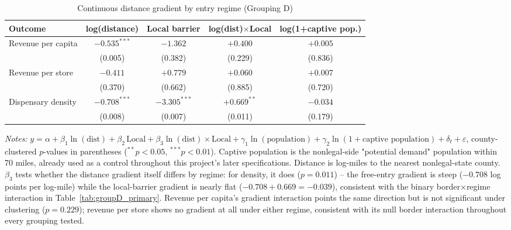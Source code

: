 \begin{table}[htbp]
\centering
\caption{Continuous distance gradient by entry regime (Grouping D)}
\label{tab:continuous_distance}
\footnotesize
\begin{tabular}{lcccc}
\toprule
Outcome & log(distance) & Local barrier & log(dist)$\times$Local & log(1+captive pop.) \\
\midrule
Revenue per capita & $-0.535^{***}$ & $-1.362$ & $+0.400$ & $+0.005$ \\
 & (0.005) & (0.382) & (0.229) & (0.836) \\
Revenue per store & $-0.411$ & $+0.779$ & $+0.060$ & $+0.007$ \\
 & (0.370) & (0.662) & (0.885) & (0.720) \\
Dispensary density & $-0.708^{***}$ & $-3.305^{***}$ & $+0.669^{**}$ & $-0.034$ \\
 & (0.008) & (0.007) & (0.011) & (0.179) \\
\bottomrule
\end{tabular}
\begin{minipage}{0.9\textwidth}
\vspace{0.3em}
\footnotesize
\textit{Notes:} $y = \alpha + \beta_1\ln(\text{dist}) + \beta_2\,\text{Local} + \beta_3\ln(\text{dist})\times
\text{Local} + \gamma_1\ln(\text{population}) + \gamma_2\ln(1+\text{captive population}) + \delta_t +
\varepsilon$, county-clustered $p$-values in parentheses ($^{**}p<0.05$, $^{***}p<0.01$). Captive population is
the nonlegal-side "potential demand" population within 70 miles, already used as a control throughout this
project's later specifications. Distance is log-miles to the nearest nonlegal-state county. $\beta_3$ tests
whether the distance gradient itself differs by regime: for density, it does ($p=0.011$) -- the free-entry
gradient is steep ($-0.708$ log points per log-mile) while the local-barrier gradient is nearly flat
($-0.708+0.669=-0.039$), consistent with the binary border$\times$regime interaction in
Table~\ref{tab:groupD_primary}. Revenue per capita's gradient interaction points the same direction but is not
significant under clustering ($p=0.229$); revenue per store shows no gradient at all under either regime,
consistent with its null border interaction throughout every grouping tested.
\end{minipage}
\end{table}
